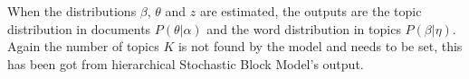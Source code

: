 When the distributions $\beta$, $\theta$ and $z$ are estimated, the outputs are the topic distribution in documents $P(\theta|\alpha)$ and the word distribution in topics $P(\beta|\eta)$.
Again the number of topics $K$ is not found by the model and needs to be set, this has been got from hierarchical Stochastic Block Model's output.